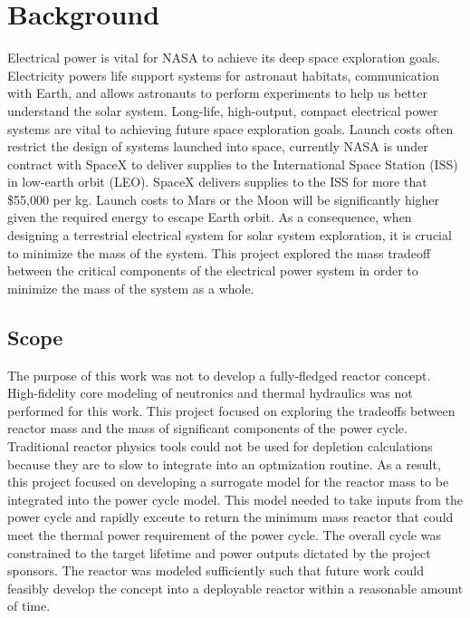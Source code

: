 \section{Background}
Electrical power is vital for NASA to achieve its deep space exploration goals.
Electricity powers life support systems for astronaut habitats, communication
with Earth, and allows astronauts to perform experiments to help us better
understand the solar system. Long-life, high-output, compact electrical power
systems are vital to achieving future space exploration goals. Launch costs 
often restrict the design of systems launched
into space, currently NASA is under contract with SpaceX to deliver supplies to
the International Space Station (ISS) in low-earth orbit (LEO). SpaceX delivers
supplies to the ISS for more that \$55,000 per kg. Launch costs to Mars or the
Moon will be significantly higher given the required energy to escape Earth
orbit. As a consequence, when designing a terrestrial electrical system for
solar system exploration, it is crucial to minimize the mass of the system. This
project explored the mass tradeoff between the critical components of the
electrical power system in order to minimize the mass of the system as a whole.

\subsection{Scope}
The purpose of this work was not to develop a fully-fledged reactor concept.
High-fidelity core modeling of neutronics and thermal hydraulics was not
performed for this work.
This project focused on exploring the tradeoffs between reactor mass and the
mass of significant components of the power cycle. Traditional reactor physics
tools could not be used for depletion calculations because they are to slow to
integrate into an optmization routine. As a result, this project focused on
developing a surrogate model for the reactor mass to be integrated into the
power cycle model. This model needed to take inputs from the power cycle and
rapidly exceute to return the minimum mass reactor that could meet the thermal
power requirement of the power cycle. The overall cycle was constrained to the
target lifetime and power outputs dictated by the project sponsors. The reactor
was modeled sufficiently such that future work could feasibly develop the
concept into a deployable reactor within a reasonable amount of time.

